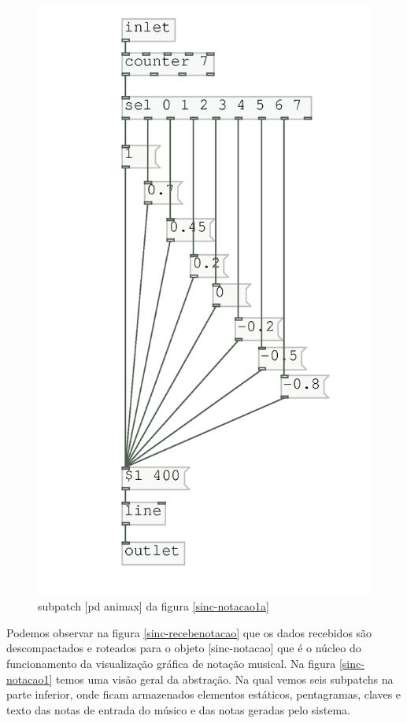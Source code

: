 \documentclass[draft]{ppgmus}
\begin{document}
\begin{figure}
\includegraphics[scale=.6]{sinc-notacao1c}
\caption{subpatch [pd animax] da figura \ref{sinc-notacao1a}}
\label{sinc-notacao1c}
\end{figure} 

Podemos observar na figura \ref{sinc-recebenotacao} que os dados recebidos são descompactados e roteados para o objeto
[sinc-notacao] que é o núcleo do funcionamento da visualização gráfica de notação musical.
Na figura \ref{sinc-notacao1} temos uma visão geral da abstração. Na qual vemos seis subpatchs na
parte inferior, onde ficam armazenados elementos estáticos, pentagramas, claves e texto das notas de entrada do
músico e das notas geradas pelo sistema.
\end{document}
